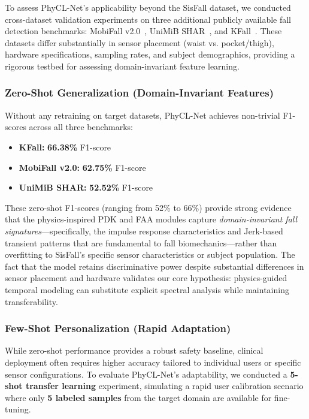 \documentclass{article}
\begin{document}
To assess PhyCL-Net's applicability beyond the SisFall dataset, we conducted cross-dataset validation experiments on three additional publicly available fall detection benchmarks: MobiFall v2.0~\cite{Vavoulas2016MobiFall}, UniMiB SHAR~\cite{Micucci2017UniMiB}, and KFall~\cite{Kwolek2014KFall}. These datasets differ substantially in sensor placement (waist vs. pocket/thigh), hardware specifications, sampling rates, and subject demographics, providing a rigorous testbed for assessing domain-invariant feature learning.

\subsubsection{Zero-Shot Generalization (Domain-Invariant Features)}

Without any retraining on target datasets, PhyCL-Net achieves non-trivial F1-scores across all three benchmarks:
\begin{itemize}
    \item \textbf{KFall:} \textbf{66.38\%} F1-score
    \item \textbf{MobiFall v2.0:} \textbf{62.75\%} F1-score
    \item \textbf{UniMiB SHAR:} \textbf{52.52\%} F1-score
\end{itemize}

These zero-shot F1-scores (ranging from 52\% to 66\%) provide strong evidence that the physics-inspired PDK and FAA modules capture \textit{domain-invariant fall signatures}---specifically, the impulse response characteristics and Jerk-based transient patterns that are fundamental to fall biomechanics---rather than overfitting to SisFall's specific sensor characteristics or subject population. The fact that the model retains discriminative power despite substantial differences in sensor placement and hardware validates our core hypothesis: physics-guided temporal modeling can substitute explicit spectral analysis while maintaining transferability.

\subsubsection{Few-Shot Personalization (Rapid Adaptation)}

While zero-shot performance provides a robust safety baseline, clinical deployment often requires higher accuracy tailored to individual users or specific sensor configurations. To evaluate PhyCL-Net's adaptability, we conducted a \textbf{5-shot transfer learning} experiment, simulating a rapid user calibration scenario where only \textbf{5 labeled samples} from the target domain are available for fine-tuning.
\end{document}
